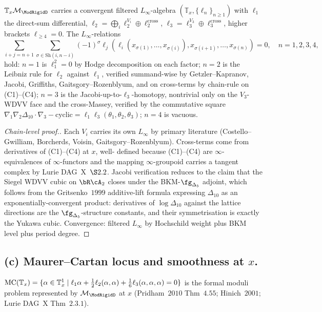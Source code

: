 \begin{theorem}
\label{wn:thm:linfty-structure-tangent-wave7-a1}
$\mathbb T_x\mathcal M_{\ModRigidD}$ carries a convergent
filtered $L_\infty$-algebra $(\mathbb T_x,\{\ell_n\}_{n\geq 1})$
with $\ell_1$ the direct-sum differential,
$\ell_2=\bigoplus_i\ell_2^{V_i}\oplus\ell_2^{\mathrm{cross}}$,
$\ell_3=\ell_3^{V_3}\oplus\ell_3^{\mathrm{cross}}$, higher
brackets $\ell_{\geq 4}=0$. The $L_\infty$-relations
\[
\sum_{i+j=n+1}\sum_{\sigma\in\mathrm{Sh}(i,n-i)}
(-1)^\sigma\ell_j(\ell_i(x_{\sigma(1)},\ldots,x_{\sigma(i)}),
x_{\sigma(i+1)},\ldots,x_{\sigma(n)})=0,\quad n=1,2,3,4,
\]
hold: $n=1$ is $\ell_1^2=0$ by Hodge decomposition on each
factor; $n=2$ is the Leibniz rule for $\ell_2$ against $\ell_1$,
verified summand-wise by Getzler--Kapranov, Jacobi, Griffiths,
Gaitsgory--Rozenblyum, and on cross-terms by chain-rule on
(C1)--(C4); $n=3$ is the Jacobi-up-to-$\ell_3$-homotopy,
nontrivial only on the $V_3$-WDVV face and the cross-Massey,
verified by the commutative square
$\nabla_1\nabla_2\Delta_{10}\cdot\nabla_3-\text{cyclic}
=\ell_1\ell_3(\theta_1,\theta_2,\theta_3)$; $n=4$ is vacuous.
\end{theorem}\ClaimStatusTheorem{}

\begin{proof}[Chain-level proof.]
Each $V_i$ carries its own $L_\infty$ by primary literature
(Costello--Gwilliam, Borcherds, Voisin, Gaitsgory--Rozenblyum).
Cross-terms come from derivatives of (C1)--(C4) at $x$, well-
defined because (C1)--(C4) are $\infty$-equivalences of
$\infty$-functors and the mapping $\infty$-groupoid carries a
tangent complex by Lurie DAG~X~$\S 2.2$. Jacobi verification
reduces to the claim that the Siegel WDVV cubic on $\bR\cA_2$
closes under the BKM-$\fg_{\Delta_5}$ adjoint, which follows
from the Gritsenko~$1999$ additive-lift formula expressing
$\Delta_{10}$ as an exponentially-convergent product:
derivatives of $\log\Delta_{10}$ against the lattice directions
are the $\fg_{\Delta_5}$-structure constants, and their
symmetrisation is exactly the Yukawa cubic. Convergence:
filtered $L_\infty$ by Hochschild weight plus BKM level plus
period degree.
\end{proof}

\subsection*{(c) Maurer--Cartan locus and smoothness at $x$.}

$\mathrm{MC}(\mathbb T_x)=\{\alpha\in\mathbb T_x^1\mid
\ell_1\alpha+\tfrac{1}{2}\ell_2(\alpha,\alpha)+
\tfrac{1}{6}\ell_3(\alpha,\alpha,\alpha)=0\}$ is the formal
moduli problem represented by $\mathcal M_{\ModRigidD}$ at $x$
(Pridham~$2010$ Thm~$4.55$; Hinich~$2001$; Lurie DAG~X
Thm~$2.3.1$).

